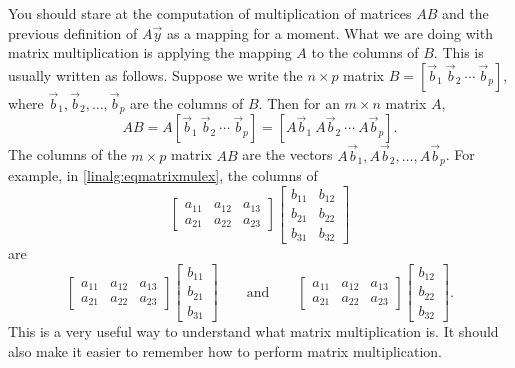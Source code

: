 You should stare at the computation of multiplication of matrices $AB$
and
the previous definition of $A\vec{y}$ as a mapping
for a moment.
What we are doing with matrix multiplication is applying
the mapping $A$ to the columns of $B$.  This is usually written as follows.
Suppose we write the $n \times p$ matrix
$B = [ \vec{b}_1 ~ \vec{b}_2 ~ \cdots ~ \vec{b}_p ]$, where
$\vec{b}_1, \vec{b}_2, \ldots, \vec{b}_p$ are the columns of $B$.  Then
for an $m \times n$ matrix $A$,
\begin{equation*}
AB = 
A [ \vec{b}_1 ~ \vec{b}_2 ~ \cdots ~ \vec{b}_p ]
=
[ A\vec{b}_1 ~ A\vec{b}_2 ~ \cdots ~ A\vec{b}_p ] .
\end{equation*}
The columns of the $m \times p$ matrix $AB$
are the
vectors $A\vec{b}_1, A\vec{b}_2, \ldots, A\vec{b}_p$.
For example, in \eqref{linalg:eqmatrixmulex},
the columns of 
\begin{equation*}
\begin{bmatrix}
a_{11} & a_{12} & a_{13} \\
a_{21} & a_{22} & a_{23}
\end{bmatrix}
\begin{bmatrix}
b_{11} & b_{12} \\
b_{21} & b_{22} \\
b_{31} & b_{32}
\end{bmatrix}
\end{equation*}
are
\begin{equation*}
\begin{bmatrix}
a_{11} & a_{12} & a_{13} \\
a_{21} & a_{22} & a_{23}
\end{bmatrix}
\begin{bmatrix}
b_{11} \\
b_{21} \\
b_{31}
\end{bmatrix}
\qquad
\text{and}
\qquad
\begin{bmatrix}
a_{11} & a_{12} & a_{13} \\
a_{21} & a_{22} & a_{23}
\end{bmatrix}
\begin{bmatrix}
b_{12} \\
b_{22} \\
b_{32}
\end{bmatrix} .
\end{equation*}
This is a very useful way to understand what matrix multiplication is.
It should also make it easier to remember how to perform matrix multiplication.

